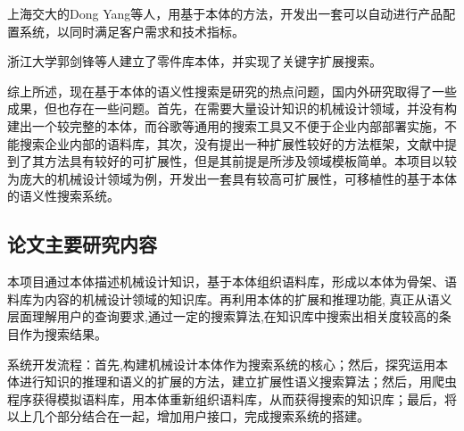 \documentclass[12pt,a4paper]{article}
\begin{document}
	上海交大的{\Times Dong Yang}等人，用基于本体的方法，开发出一套可以自动进行产品配置系统，以同时满足客户需求和技术指标\cite{21}。

	浙江大学郭剑锋等人建立了零件库本体，并实现了关键字扩展搜索\cite{22}。

	综上所述，现在基于本体的语义性搜索是研究的热点问题，国内外研究取得了一些成果，但也存在一些问题。首先，在需要大量设计知识的机械设计领域，并没有构建出一个较完整的本体，而谷歌等通用的搜索工具又不便于企业内部部署实施，不能搜索企业内部的语料库，其次，没有提出一种扩展性较好的方法框架，文献\cite{15}中提到了其方法具有较好的可扩展性，但是其前提是所涉及领域模板简单。本项目以较为庞大的机械设计领域为例，开发出一套具有较高可扩展性，可移植性的基于本体的语义性搜索系统。
		
	\subsection{论文主要研究内容}
	本项目通过本体描述机械设计知识，基于本体组织语料库，形成以本体为骨架、语料库为内容的机械设计领域的知识库。再利用本体的扩展和推理功能, 真正从语义层面理解用户的查询要求,通过一定的搜索算法,在知识库中搜索出相关度较高的条目作为搜索结果。
	
	系统开发流程：首先,构建机械设计本体作为搜索系统的核心；然后，探究运用本体进行知识的推理和语义的扩展的方法，建立扩展性语义搜索算法；然后，用爬虫程序获得模拟语料库，用本体重新组织语料库，从而获得搜索的知识库；最后，将以上几个部分结合在一起，增加用户接口，完成搜索系统的搭建。
\end{document}
